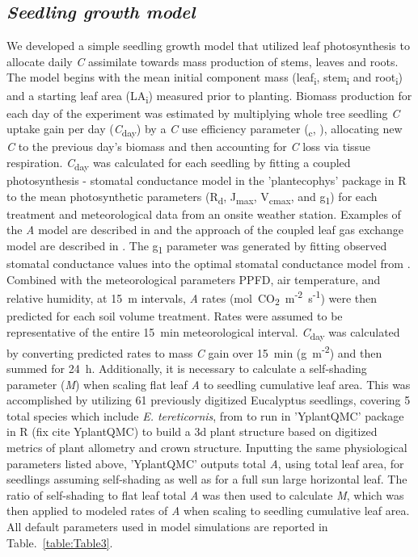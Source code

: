 \documentclass[a4paper]{article}\usepackage[]{graphicx}\usepackage[]{color}
\begin{document}
\subsection*{\textit{Seedling growth model}}
We developed a simple seedling growth model that utilized leaf photosynthesis to allocate daily \textit{C} assimilate towards mass production of stems, leaves and roots. The model begins with the mean initial component mass (leaf\textsubscript{i}, stem\textsubscript{i} and root\textsubscript{i}) and a starting leaf area (LA\textsubscript{i}) measured prior to planting. Biomass production for each day of the experiment was estimated by multiplying whole tree seedling \textit{C} uptake gain per day (\textit{C}\textsubscript{day}) by a \textit{C} use efficiency parameter (\textUpsilon\textsubscript{c}, \citet{makela1997carbon}), allocating new \textit{C} to the previous day’s biomass and then accounting for \textit{C} loss via tissue respiration. \textit{C}\textsubscript{day} was calculated for each seedling by fitting a coupled photosynthesis - stomatal conductance model \citep{farquhar1980biochemical,medlyn2011reconciling} in the 'plantecophys' package in R \citep{Duursma2014} to the mean photosynthetic parameters (R\textsubscript{d}, J\textsubscript{max}, V\textsubscript{cmax}, and g\textsubscript{1}) for each treatment and meteorological data from an onsite weather station.  Examples of the \textit{A} model are described in \citet{medlyn2002temperature} and the approach of the coupled leaf gas exchange model are described in \citet{duursma2014peaked}. The g\textsubscript{1} parameter was generated by fitting observed stomatal conductance values into the optimal stomatal conductance model from \citep{medlyn2012reconciling}. Combined with the meteorological parameters PPFD, air temperature, and relative humidity, at 15~m intervals, \textit{A} rates ({\textmugreek}mol~CO\textsubscript{2}~m\textsuperscript{-2}~s\textsuperscript{-1}) were then predicted for each soil volume treatment. Rates were assumed to be representative of the entire 15~min meteorological interval. \textit{C}\textsubscript{day} was calculated by converting predicted rates to mass \textit{C} gain over 15~min (g~m\textsuperscript{-2}) and then summed for 24~h. Additionally, it is necessary to calculate a self-shading parameter (\textit{M}) when scaling flat leaf \textit{A} to seedling cumulative leaf area. This was accomplished by utilizing 61 previously digitized Eucalyptus seedlings, covering 5 total species which include \textit{E. tereticornis}, from \citet{duursma2012light} to run in 'YplantQMC' package in R (fix cite YplantQMC) to build a 3d plant structure based on digitized metrics of plant allometry and crown structure. Inputting the same physiological parameters listed above, 'YplantQMC' outputs total \textit{A}, using total leaf area, for seedlings assuming self-shading as well as for a full sun large horizontal leaf.  The ratio of self-shading to flat leaf total \textit{A} was then used to calculate \textit{M}, which was then applied to modeled rates of \textit{A} when scaling to seedling cumulative leaf area. All default parameters used in model simulations are reported in Table.~\ref{table:Table3}.
\end{document}
